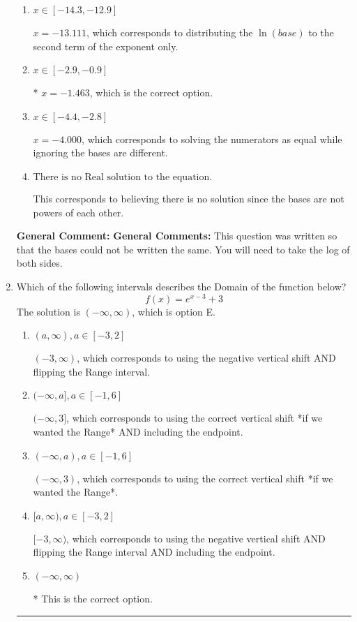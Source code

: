 \documentclass{extbook}[14pt]
\newcommand{\litem}[1]{\item #1

\rule{\textwidth}{0.4pt}}
\begin{document}
\begin{enumerate}
{\begin{enumerate}[label=\Alph*.]
$x = -0.446$, which corresponds to distributing the $\ln(base)$ to the first term of the exponent only.
\item \( x \in [-14.3, -12.9] \)

$x = -13.111$, which corresponds to distributing the $\ln(base)$ to the second term of the exponent only.
\item \( x \in [-2.9, -0.9] \)

* $x = -1.463$, which is the correct option.
\item \( x \in [-4.4, -2.8] \)

$x = -4.000$, which corresponds to solving the numerators as equal while ignoring the bases are different.
\item \( \text{There is no Real solution to the equation.} \)

This corresponds to believing there is no solution since the bases are not powers of each other.
\end{enumerate}

\textbf{General Comment:} \textbf{General Comments:} This question was written so that the bases could not be written the same. You will need to take the log of both sides.
}
\litem{
Which of the following intervals describes the Domain of the function below?
\[ f(x) = e^{x-3}+3 \]The solution is \( (-\infty, \infty) \), which is option E.\begin{enumerate}[label=\Alph*.]
\item \( (a, \infty), a \in [-3, 2] \)

$(-3, \infty)$, which corresponds to using the negative vertical shift AND flipping the Range interval.
\item \( (-\infty, a], a \in [-1, 6] \)

$(-\infty, 3]$, which corresponds to using the correct vertical shift *if we wanted the Range* AND including the endpoint.
\item \( (-\infty, a), a \in [-1, 6] \)

$(-\infty, 3)$, which corresponds to using the correct vertical shift *if we wanted the Range*.
\item \( [a, \infty), a \in [-3, 2] \)

$[-3, \infty)$, which corresponds to using the negative vertical shift AND flipping the Range interval AND including the endpoint.
\item \( (-\infty, \infty) \)

* This is the correct option.
\end{enumerate}

}
\end{enumerate}
\end{document}
